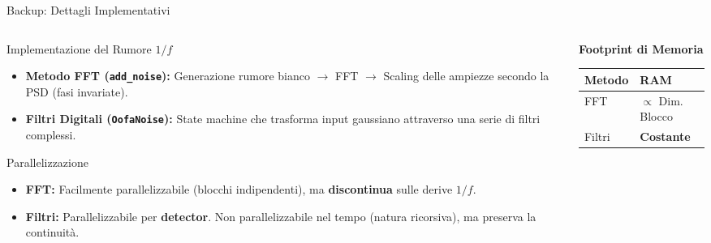 \documentclass[10pt, aspectratio=169, handout]{beamer}
\begin{document}
\begin{frame}{Backup: Dettagli Implementativi}
  \begin{columns}[T]
    \begin{column}{0.55\textwidth}
      \begin{block}{Implementazione del Rumore $1/f$}
        \footnotesize
        \begin{itemize}
            \item \textbf{Metodo FFT (\texttt{add\_noise}):}
            Generazione rumore bianco $\rightarrow$ FFT $\rightarrow$ Scaling delle ampiezze secondo la PSD (fasi invariate).
            \item \textbf{Filtri Digitali (\texttt{OofaNoise}):}
            State machine che trasforma input gaussiano attraverso una serie di filtri complessi.
        \end{itemize}
      \end{block}

    \vspace{0.1cm}
    
      \begin{block}{Parallelizzazione}
        \footnotesize
        \begin{itemize}
            \item \textbf{FFT:} Facilmente parallelizzabile (blocchi indipendenti), ma \textbf{discontinua} sulle derive $1/f$.
            \item \textbf{Filtri:} Parallelizzabile per \textbf{detector}. Non parallelizzabile nel tempo (natura ricorsiva), ma preserva la continuità.
        \end{itemize}
      \end{block}
    \end{column}

    \begin{column}{0.4\textwidth}
      \vspace{0.5cm}
      \centering
      \small \textbf{Footprint di Memoria}
      \vspace{0.2cm}
      
      \begin{tabular}{ll}
        \toprule
        \textbf{Metodo} & \textbf{RAM} \\
        \midrule
        FFT & $\propto$ Dim. Blocco \\
        Filtri & \textbf{Costante} \\
        \bottomrule
      \end{tabular}
      

\end{column}
\end{columns}
\end{frame}
\end{document}
